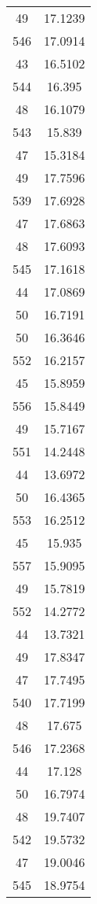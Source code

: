 \begin{tabular}[c]{|c|c|}
        49&   17.1239\\
       546&   17.0914\\
        43&   16.5102\\
       544&    16.395\\
        48&   16.1079\\
       543&    15.839\\
        47&   15.3184\\
        49&   17.7596\\
       539&   17.6928\\
        47&   17.6863\\
        48&   17.6093\\
       545&   17.1618\\
        44&   17.0869\\
        50&   16.7191\\
        50&   16.3646\\
       552&   16.2157\\
        45&   15.8959\\
       556&   15.8449\\
        49&   15.7167\\
       551&   14.2448\\
        44&   13.6972\\
        50&   16.4365\\
       553&   16.2512\\
        45&    15.935\\
       557&   15.9095\\
        49&   15.7819\\
       552&   14.2772\\
        44&   13.7321\\
        49&   17.8347\\
        47&   17.7495\\
       540&   17.7199\\
        48&    17.675\\
       546&   17.2368\\
        44&    17.128\\
        50&   16.7974\\
        48&   19.7407\\
       542&   19.5732\\
        47&   19.0046\\
       545&   18.9754\\

\end{tabular}
